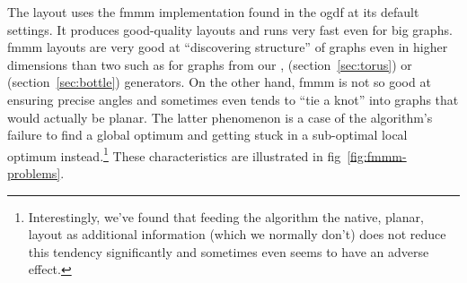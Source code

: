 \documentclass{graphstudy}
\begin{document}
The  layout uses the \ac{fmmm} implementation found in the \ac{ogdf} at its default settings.  It produces
good-quality layouts and runs very fast even for big graphs.  \ac{fmmm} layouts are very good at \enquote{discovering
  structure} of graphs even in higher dimensions than two such as for graphs from our , 
(\acs{section}~\ref{sec:torus}) or  (\acs{section}~\ref{sec:bottle}) generators.  On the other hand,
\ac{fmmm} is not so good at ensuring precise angles and sometimes even tends to \enquote{tie a knot} into graphs that
would actually be planar.  The latter phenomenon is a case of the algorithm's failure to find a global optimum and
getting stuck in a sub-optimal local optimum instead.\footnote{%
  Interestingly, we've found that feeding the algorithm the native, planar, layout as additional information (which we
  normally don't) does not reduce this tendency significantly and sometimes even seems to have an adverse effect.
}
These characteristics are illustrated in \acl{fig}~\ref{fig:fmmm-problems}.
\end{document}
